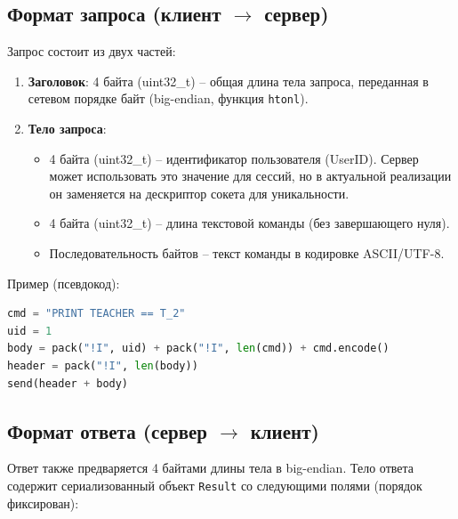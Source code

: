 \documentclass[12pt,a4paper]{article}
\begin{document}
\subsection{Формат запроса (клиент $\rightarrow$ сервер)}
Запрос состоит из двух частей:
\begin{enumerate}
  \item \textbf{Заголовок}: 4 байта (uint32\_t) – общая длина тела запроса, переданная в сетевом порядке байт (big-endian, функция \texttt{htonl}).
  \item \textbf{Тело запроса}:
  \begin{itemize}
    \item 4 байта (uint32\_t) – идентификатор пользователя (UserID). Сервер может использовать это значение для сессий, но в актуальной реализации он заменяется на дескриптор сокета для уникальности.
    \item 4 байта (uint32\_t) – длина текстовой команды (без завершающего нуля).
    \item Последовательность байтов – текст команды в кодировке ASCII/UTF-8.
  \end{itemize}
\end{enumerate}

Пример (псевдокод):
\begin{lstlisting}[language=Python, caption=Пример формирования запроса]
cmd = "PRINT TEACHER == T_2"
uid = 1
body = pack("!I", uid) + pack("!I", len(cmd)) + cmd.encode()
header = pack("!I", len(body))
send(header + body)
\end{lstlisting}

\subsection{Формат ответа (сервер $\rightarrow$ клиент)}
Ответ также предваряется 4 байтами длины тела в big-endian. Тело ответа содержит сериализованный объект \texttt{Result} со следующими полями (порядок фиксирован):
\end{document}
